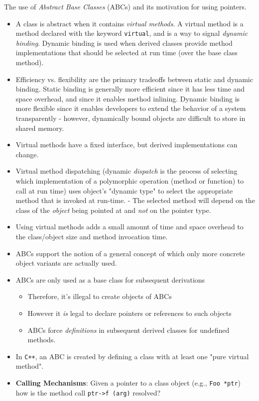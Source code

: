 \documentclass[twoside,english]{uiofysmaster}
\begin{document}
The use of \textit{Abstract Base Classes} (ABCs) and its motivation for using pointers.
\begin{itemize}
	\item A class is abstract when it contains \textit{virtual methods}. A virtual method is a method declared with the keyword \texttt{virtual}, and is a way to signal \textit{dynamic binding}. Dynamic binding is used when derived classes provide method implementations that should be selected at run time (over the base class method).
	\item Efficiency vs. flexibility are the primary tradeoffs between static and dynamic binding. Static binding is generally more efficient since it has less time and space overhead, and since it enables method inlining. Dynamic binding is more flexible since it enables developers to extend the behavior of a system transparently - however, dynamically bound objects are difficult to store in shared memory.
	\item Virtual methods have a fixed interface, but derived implementations can change.
	\item Virtual method dispatching (dynamic \textit{dispatch} is the process of selecting which implementation of a polymorphic operation (method or function) to call at run time) uses object's "dynamic type" to select the appropriate method that is invoked at run-time. - The selected method will depend on the class of the \textit{object} being pointed at and \textit{not} on the pointer type. 
	\item Using virtual methods adds a small amount of time and space overhead to the class/object size and method invocation time.
	\item ABCs support the notion of a general concept of which only more concrete object variants are actually used.
	\item ABCs are only used as a base class for subsequent derivations
	\begin{itemize}
		\item Therefore, it's illegal to create objects of ABCs
		\item However it \textit{is} legal to declare pointers or references to such objects
		\item ABCs force \textit{definitions} in subsequent derived classes for undefined methods.
	\end{itemize}
	\item In \texttt{C++}, an ABC is created by defining a class with at least one "pure virtual method". 
	\item \textbf{Calling Mechanisms}: Given a pointer to a class object (e.g., \texttt{Foo *ptr}) how is the method call \texttt{ptr->f (arg)} resolved?

\end{itemize}
\end{document}
